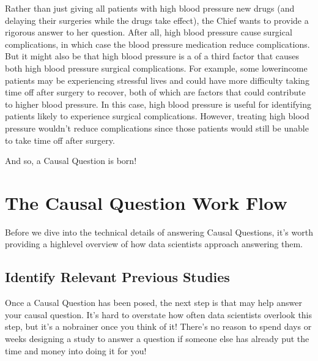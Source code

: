 \documentclass[letterpaper,10pt,english]{jupyterBook}
\begin{document}
\sphinxAtStartPar
Rather than just giving all patients with high blood pressure new drugs (and delaying their surgeries while the drugs take effect), the Chief wants  to provide a rigorous answer to her question. After all, high blood pressure  cause surgical complications, in which case the blood pressure medication  reduce complications. But it might also be that high blood pressure is a  of a third factor that causes both high blood pressure  surgical complications. For example, some lower\sphinxhyphen{}income patients may be experiencing stressful lives and could have more difficulty taking time off after surgery to recover, both of which are factors that could contribute to higher blood pressure. In this case, high blood pressure is useful for identifying patients likely to experience surgical complications. However, treating high blood pressure wouldn’t reduce complications since those patients would still be unable to take time off after surgery.

\sphinxAtStartPar
And so, a Causal Question is born!




\section{The Causal Question Work Flow}
\label{\detokenize{30_questions/35_using_causal_questions:the-causal-question-work-flow}}
\sphinxAtStartPar
Before we dive into the technical details of answering Causal Questions, it’s worth providing a high\sphinxhyphen{}level overview of how data scientists approach answering them.


\subsection{Identify Relevant Previous Studies}
\label{\detokenize{30_questions/35_using_causal_questions:identify-relevant-previous-studies}}
\sphinxAtStartPar
Once a Causal Question has been posed, the next step is  that may help answer your causal question. It’s hard to overstate how often data scientists overlook this step, but it’s  a no\sphinxhyphen{}brainer once you think of it! There’s no reason to spend days or weeks designing a study to answer a question if someone else has already put the time and money into doing it for you!
\end{document}
